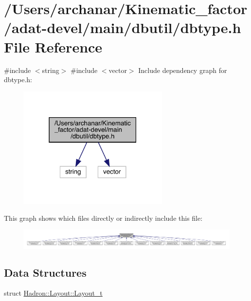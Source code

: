 \hypertarget{adat-devel_2main_2dbutil_2dbtype_8h}{}\section{/\+Users/archanar/\+Kinematic\+\_\+factor/adat-\/devel/main/dbutil/dbtype.h File Reference}
\label{adat-devel_2main_2dbutil_2dbtype_8h}
{\ttfamily \#include $<$string$>$}\newline
{\ttfamily \#include $<$vector$>$}\newline
Include dependency graph for dbtype.\+h\+:
\nopagebreak
\begin{figure}[H]
\begin{center}
\leavevmode
\includegraphics[width=214pt]{d3/d86/adat-devel_2main_2dbutil_2dbtype_8h__incl}
\end{center}
\end{figure}
This graph shows which files directly or indirectly include this file\+:
\nopagebreak
\begin{figure}[H]
\begin{center}
\leavevmode
\includegraphics[width=350pt]{d0/d19/adat-devel_2main_2dbutil_2dbtype_8h__dep__incl}
\end{center}
\end{figure}
\subsection*{Data Structures}
\begin{DoxyCompactItemize}
\item 
struct \mbox{\hyperlink{structHadron_1_1Layout_1_1Layout__t}{Hadron\+::\+Layout\+::\+Layout\+\_\+t}}
\end{DoxyCompactItemize}
